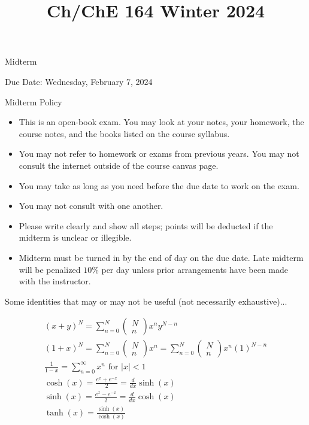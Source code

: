 \documentclass[10pt]{article}
\title{Ch/ChE 164 Winter 2024 }
\author{}
\date{}
\begin{document}
\maketitle
Midterm

Due Date: Wednesday, February 7, 2024

Midterm Policy

\begin{itemize}
  \item This is an open-book exam. You may look at your notes, your homework, the course notes, and the books listed on the course syllabus.
  \item You may not refer to homework or exams from previous years. You may not consult the internet outside of the course canvas page.
  \item You may take as long as you need before the due date to work on the exam.
  \item You may not consult with one another.
  \item Please write clearly and show all steps; points will be deducted if the midterm is unclear or illegible.
  \item Midterm must be turned in by the end of day on the due date. Late midterm will be penalized $10 \%$ per day unless prior arrangements have been made with the instructor.
\end{itemize}

Some identities that may or may not be useful (not necessarily exhaustive)...

$$
\begin{gathered}
(x+y)^{N}=\sum_{n=0}^{N}\left(\begin{array}{l}
N \\
n
\end{array}\right) x^{n} y^{N-n} \\
(1+x)^{N}=\sum_{n=0}^{N}\left(\begin{array}{l}
N \\
n
\end{array}\right) x^{n}=\sum_{n=0}^{N}\left(\begin{array}{l}
N \\
n
\end{array}\right) x^{n}(1)^{N-n} \\
\frac{1}{1-x}=\sum_{n=0}^{\infty} x^{n} \text { for }|x|<1 \\
\cosh (x)=\frac{e^{x}+e^{-x}}{2}=\frac{d}{d x} \sinh (x) \\
\sinh (x)=\frac{e^{x}-e^{-x}}{2}=\frac{d}{d x} \cosh (x) \\
\tanh (x)=\frac{\sinh (x)}{\cosh (x)}
\end{gathered}
$$
\end{document}
